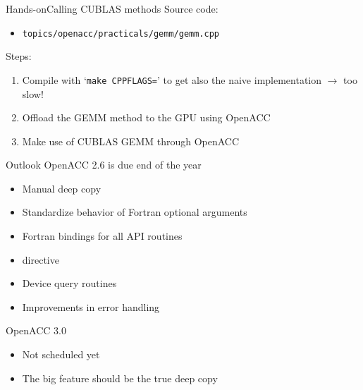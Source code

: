 \documentclass[12pt,aspectratio=169]{beamer}
\newcommand\shinline[2][]{\lstinline[style=shstyle,basicstyle=\ttfamily,#1]!#2!}
\begin{document}
\begin{frame}[fragile]{Hands-on}{Calling CUBLAS methods}
  Source code:
  \begin{itemize}
  \item \shinline{topics/openacc/practicals/gemm/gemm.cpp}
  \end{itemize}
  \vfill
  Steps:
  \begin{enumerate}
  \item Compile with `\shinline{make CPPFLAGS=}' to get also the naive implementation $\rightarrow$ too slow!
  \item Offload the GEMM method to the GPU using OpenACC
  \item Make use of CUBLAS GEMM through OpenACC
  \end{enumerate}
\end{frame}


\begin{frame}[fragile]{Outlook}
  OpenACC 2.6 is due end of the year
  \begin{itemize}
  \item Manual deep copy
  \item Standardize behavior of Fortran optional arguments
  \item Fortran bindings for all API routines
  \item {} directive
  \item Device query routines
  \item Improvements in error handling
  \end{itemize}
  OpenACC 3.0
  \begin{itemize}
  \item Not scheduled yet
  \item The big feature should be the true deep copy
  \end{itemize}
\end{frame}
\end{document}
